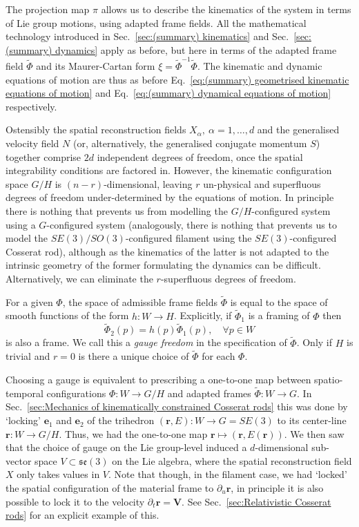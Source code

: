 The projection map $\pi$ allows us to describe the kinematics of the system in terms of Lie group motions, using adapted frame fields. All the mathematical technology introduced in Sec.~\ref{sec:(summary) kinematics} and Sec.~\ref{sec:(summary) dynamics} apply as before, but here in terms of the adapted frame field $\tilde{\Phi}$ and its Maurer-Cartan form $\xi = \tilde{\Phi}^{-1} \tilde{\Phi}$. The kinematic and dynamic equations of motion are thus as before Eq.~\ref{eq:(summary) geometrised kinematic equations of motion} and Eq.~\ref{eq:(summary) dynamical equations of motion} respectively.

Ostensibly the spatial reconstruction fields $X_\alpha,\ \alpha=1,\dots, d$ and the generalised velocity field $N$ (or, alternatively, the generalised conjugate momentum $S$) together comprise $2d$ independent degrees of freedom, once the spatial integrability conditions are factored in. However, the kinematic configuration space $G/H$ is $(n-r)$-dimensional, leaving $r$ un-physical and superfluous degrees of freedom under-determined by the equations of motion. In principle there is nothing that prevents us from modelling the $G/H$-configured system using a $G$-configured system (analogously, there is nothing that prevents us to model the $SE(3)/SO(3)$-configured filament using the $SE(3)$-configured Cosserat rod), although as the kinematics of the latter is not adapted to the intrinsic geometry of the former formulating the dynamics can be difficult. Alternatively, we can eliminate the $r$-superfluous degrees of freedom.

For a given $\Phi$, the space of admissible frame fields $\tilde{\Phi}$ is equal to the space of smooth functions of the form $h : W \to H$. Explicitly, if $\tilde{\Phi}_1$ is a framing of $\Phi$ then
\begin{equation}
\tilde{\Phi}_2(p) = h(p) \tilde{\Phi}_1(p), \quad \forall p \in W
\end{equation}
is also a frame. We call this a \textit{gauge freedom} in the specification of $\tilde{\Phi}$. Only if $H$ is trivial and $r=0$ is there a unique choice of $\tilde{\Phi}$ for each $\Phi$.

Choosing a gauge is equivalent to prescribing a one-to-one map between spatio-temporal configurations $\Phi : W \to G/H$ and adapted frames $\tilde{\Phi} : W \to G$. In Sec.~\ref{sec:Mechanics of kinematically constrained Cosserat rods} this was done by `locking' $\mathbf{e}_1$ and $\mathbf{e}_2$ of the trihedron $(\mathbf{r}, E) : W \to G = SE(3)$ to its center-line $\mathbf{r} : W \to G/H$. Thus, we had the one-to-one map $\mathbf{r} \mapsto (\mathbf{r}, E(\mathbf{r}) )$. We then saw that the choice of gauge on the Lie group-level induced a $d$-dimensional sub-vector space $V \subset \mathfrak{se}(3)$ on the Lie algebra, where the spatial reconstruction field $X$ only takes values in $V$. Note that though, in the filament case, we had `locked' the spatial configuration of the material frame to $\partial_u \mathbf{r}$, in principle it is also possible to lock it to the velocity $\partial_t \mathbf{r} = \mathbf{V}$. See Sec.~\ref{sec:Relativistic Cosserat rods} for an explicit example of this.

